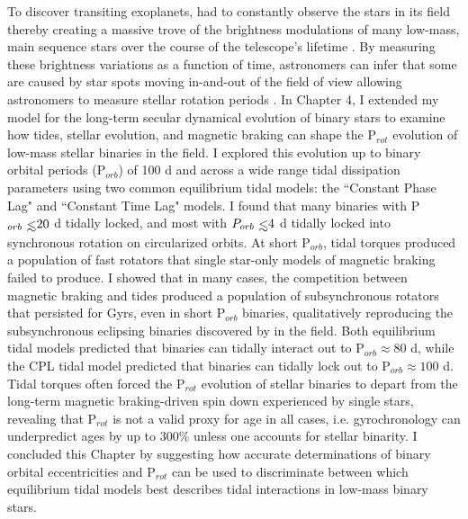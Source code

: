 To discover transiting exoplanets, \kepler had to constantly observe the stars in its field thereby creating a massive trove of the brightness modulations of many low-mass, main sequence stars over the course of the telescope's lifetime \citep{Borucki2003,Borucki2010}. By measuring these brightness variations as a function of time, astronomers can infer that some are caused by star spots moving in-and-out of the field of view allowing astronomers to measure stellar rotation periods \citep[P$_{rot}$, see][]{McQuillan2014}. In Chapter 4, I extended my model for the long-term secular dynamical evolution of binary stars to examine how tides, stellar evolution, and magnetic braking can shape the P$_{rot}$ evolution of low-mass stellar binaries in the \kepler field. I explored this evolution up to binary orbital periods (P$_{orb}$) of 100 d and across a wide range tidal dissipation parameters using two common equilibrium tidal models: the ``Constant Phase Lag" \citep[CPL,][]{FerrazMello2008} and ``Constant Time Lag" \citep[CTL,][]{Leconte2010} models. I found that many binaries with P$_{orb} \lsim 20$ d tidally locked, and most with $P_{orb} \lsim 4$ d tidally locked into synchronous rotation on circularized orbits. At short P$_{orb}$, tidal torques produced a population of fast rotators that single star-only models of magnetic braking failed to produce.  I showed that in many cases, the competition between magnetic braking and tides produced a population of subsynchronous rotators that persisted for Gyrs, even in short P$_{orb}$ binaries, qualitatively reproducing the subsynchronous eclipsing binaries discovered by \citet{Lurie2017} in the \kepler field. Both equilibrium tidal models predicted that binaries can tidally interact out to P$_{orb} \approx 80$ d, while the CPL tidal model predicted that binaries can tidally lock out to P$_{orb} \approx 100$ d. Tidal torques often forced the P$_{rot}$ evolution of stellar binaries to depart from the long-term magnetic braking-driven spin down experienced by single stars, revealing that P$_{rot}$ is not a valid proxy for age in all cases, i.e. gyrochronology can underpredict ages by up to $300\%$ unless one accounts for stellar binarity. I concluded this Chapter by suggesting how accurate determinations of binary orbital eccentricities and P$_{rot}$ can be used to discriminate between which equilibrium tidal models best describes tidal interactions in low-mass binary stars.
 
